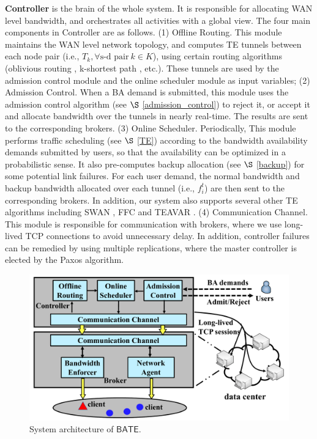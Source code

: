 \documentclass[sigconf]{acmart}
\begin{document}
\textbf{Controller} is the brain of the whole system. It is responsible for allocating WAN level bandwidth, and orchestrates all activities with a global view. The four main components in Controller are as follows.
(1) Offline Routing.
This module maintains the WAN level network topology, and computes TE tunnels between each node pair
 (i.e., $T_k,\forall \text{s-d pair} \ k \in K$), using certain routing algorithms (oblivious routing \cite{SMORE}, k-shortest path \cite{swan}, etc.). 
These tunnels are used by the admission control module and the online scheduler module as input variables;
(2) Admission Control.
When a BA demand is submitted, this module uses the admission control algorithm (see $\S$ \ref{admission_control}) to reject it, or accept it and allocate bandwidth over the tunnels in nearly real-time.
The results are sent to the corresponding brokers.
(3) Online Scheduler. 
Periodically, This module performs traffic scheduling (see $\S$ \ref{TE}) according to the bandwidth availability demands submitted by users, so that the availability can be optimized in a probabilistic sense. 
It also pre-computes backup allocation (see $\S$ \ref{backup}) for some potential link failures.
For each user demand, the normal bandwidth and backup bandwidth allocated over each tunnel (i.e., $f_i^t$) are then sent to the corresponding brokers. 
In addition, our system also supports several other TE algorithms including SWAN \cite{swan}, FFC \cite{FFC} and TEAVAR \cite{Teavar}.
(4) Communication Channel.
This module is responsible for communication with brokers, where we use long-lived TCP connections to avoid unnecessary delay. 
In addition, controller failures can be remedied by using multiple replications, 
where the master controller is elected by the Paxos \cite{lamport1998the} algorithm.

\begin{figure}
\begin{center}
\includegraphics [width=0.9\columnwidth] {fig/inter-DC-WAN-V3.pdf}
\caption{System architecture of $\mathsf{BATE}$.}
\label{pic-overview}
\end{center}
\end{figure}
\end{document}
